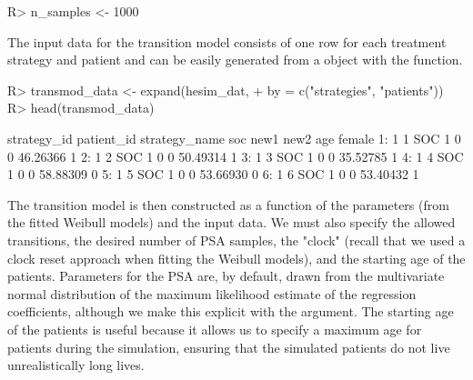 \documentclass[article, nojss]{jss}\usepackage[]{graphicx}\usepackage[]{color}
\begin{document}
\begin{Schunk}
\begin{Sinput}
R> n_samples <- 1000
\end{Sinput}
\end{Schunk}

The input data for the transition model consists of one row for each treatment strategy and patient and can be easily generated from a  object with the  function.

\begin{Schunk}
\begin{Sinput}
R> transmod_data <- expand(hesim_dat,
+                          by = c("strategies", "patients"))
R> head(transmod_data)
\end{Sinput}
\begin{Soutput}
   strategy_id patient_id strategy_name soc new1 new2      age female
1:           1          1           SOC   1    0    0 46.26366      1
2:           1          2           SOC   1    0    0 50.49314      1
3:           1          3           SOC   1    0    0 35.52785      1
4:           1          4           SOC   1    0    0 58.88309      0
5:           1          5           SOC   1    0    0 53.66930      0
6:           1          6           SOC   1    0    0 53.40432      1
\end{Soutput}
\end{Schunk}

The transition model is then constructed as a function of the parameters (from the fitted Weibull models) and the input data. We must also specify the allowed transitions, the desired number of PSA samples, the "clock" (recall that we used a clock reset approach when fitting the Weibull models), and the starting age of the patients. Parameters for the PSA are, by default, drawn from the multivariate normal distribution of the maximum likelihood estimate of the regression coefficients, although we make this explicit with the  argument. The starting age of the patients is useful because it allows us to specify a maximum age for patients during the simulation, ensuring that the simulated patients do not live unrealistically long lives. 

\begin{Schunk}
\end{Schunk}
\end{document}
